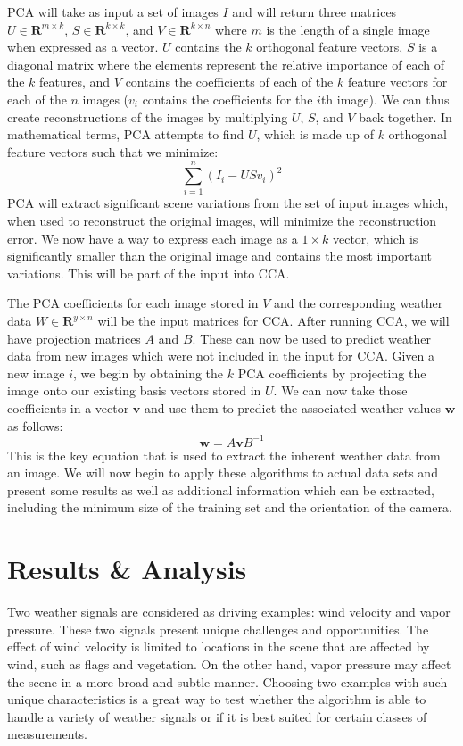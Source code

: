 PCA will take as input a set of images $I$ and will return three matrices $U\in \mathbf{R}^{m\times k}$, $S\in \mathbf{R}^{k\times k}$, and $V\in \mathbf{R}^{k\times n}$ where $m$ is the length of a single image when expressed as a vector. $U$ contains the $k$ orthogonal feature vectors, $S$ is a diagonal matrix where the elements represent the relative importance of each of the $k$ features, and $V$ contains the coefficients of each of the $k$ feature vectors for each of the $n$ images ($v_i$ contains the coefficients for the $i$th image). We can thus create reconstructions of the images by multiplying $U$, $S$, and $V$ back together. In mathematical terms, PCA attempts to find $U$, which is made up of $k$ orthogonal feature vectors such that we minimize:
\begin{equation}\sum_{i=1}^{n}{\left(I_i - USv_i\right)^2}\label{eq:pca}\end{equation}
PCA will extract significant scene variations from the set of input images which, when used to reconstruct the original images, will minimize the reconstruction error. We now have a way to express each image as a $1\times k$ vector, which is significantly smaller than the original image and contains the most important variations. This will be part of the input into CCA.

The PCA coefficients for each image stored in $V$ and the corresponding weather data $W \in \mathbf{R}^{y\times n}$ will be the input matrices for CCA. After running CCA, we will have projection matrices $A$ and $B$. These can now be used to predict weather data from new images which were not included in the input for CCA. Given a new image $i$, we begin by obtaining the $k$ PCA coefficients by projecting the image onto our existing basis vectors stored in $U$. We can now take those coefficients in a vector $\mathbf{v}$ and use them to predict the associated weather values $\mathbf{w}$ as follows:
\begin{equation}\label{eq:predict}\mathbf{w}=A\mathbf{v}B^{-1}\end{equation}
This is the key equation that is used to extract the inherent weather data from an image. We will now begin to apply these algorithms to actual data sets and present some results as well as additional information which can be extracted, including the minimum size of the training set and the orientation of the camera.

\chapter{Results \& Analysis}
\label{cpt:results}
Two weather signals are considered as driving examples: wind velocity and vapor pressure. These two signals present unique challenges and opportunities. The effect of wind velocity is limited to locations in the scene that are affected by wind, such as flags and vegetation. On the other hand, vapor pressure may affect the scene in a more broad and subtle manner. Choosing two examples with such unique characteristics is a great way to test whether the algorithm is able to handle a variety of weather signals or if it is best suited for certain classes of measurements.

